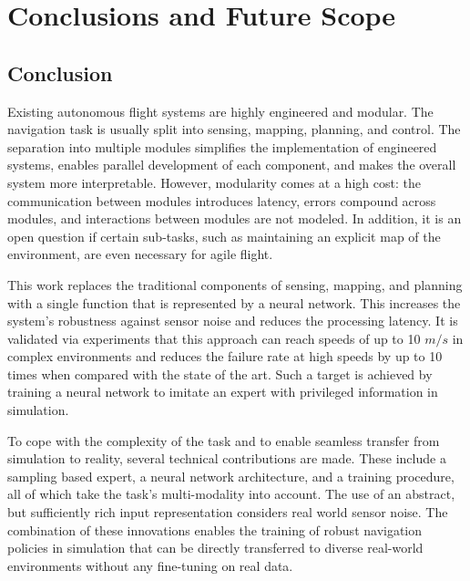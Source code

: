 \chapter{Conclusions and Future Scope}

\section{Conclusion}
Existing autonomous flight systems are highly engineered and modular. The navigation task is usually split into sensing, mapping, planning, and control. The separation into multiple modules simplifies the implementation of engineered systems, enables parallel development of each component, and makes the overall system more interpretable. However, modularity comes at a high cost: the communication between modules introduces latency, errors compound across modules, and interactions between modules are not modeled. In addition, it is an open question if certain sub-tasks, such as maintaining an explicit map of the environment, are even necessary for agile flight.

This work replaces the traditional components of sensing, mapping, and planning with a single function that is represented by a neural network. This increases the system’s robustness against sensor noise and reduces the processing latency. It is validated via experiments that this approach can reach speeds of up to 10 $m/s$ in complex environments and reduces the failure rate at high speeds by up to 10 times when compared with the state of the art. Such a target is achieved by training a neural network to imitate an expert with privileged information in simulation. 

To cope with the complexity of the task and to enable seamless transfer from simulation to reality, several technical contributions are made. These include a sampling based expert, a neural network architecture, and a training procedure, all of which take the task’s multi-modality into account. The use of an abstract, but sufficiently rich input representation considers real world sensor noise. The combination of these innovations enables the training of robust navigation policies in simulation that can be directly transferred to diverse real-world environments without any fine-tuning on real data.

